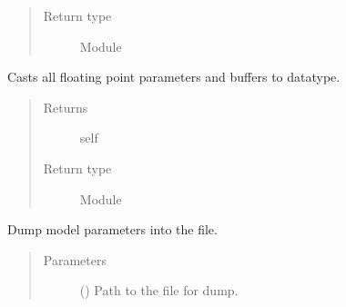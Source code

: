 \documentclass[letterpaper,10pt,english]{sphinxmanual}
\begin{document}
\begin{fulllineitems}
\begin{fulllineitems}
\begin{quote}
\begin{description}
\item[{Return type}] \leavevmode
Module

\end{description}\end{quote}

\end{fulllineitems}


\begin{fulllineitems}
\label{\detokenize{api/dynamics:geology.metamodelling.dynamics.NeuralDifferentialEquation.double}}
Casts all floating point parameters and buffers to  datatype.
\begin{quote}\begin{description}
\item[{Returns}] \leavevmode
self

\item[{Return type}] \leavevmode
Module

\end{description}\end{quote}

\end{fulllineitems}


\begin{fulllineitems}
\label{\detokenize{api/dynamics:geology.metamodelling.dynamics.NeuralDifferentialEquation.dump}}
Dump model parameters into the file.
\begin{quote}\begin{description}
\item[{Parameters}] \leavevmode
{} () \textendash{} Path to the file for dump.

\end{description}\end{quote}

\end{fulllineitems}



\end{fulllineitems}
\end{document}
